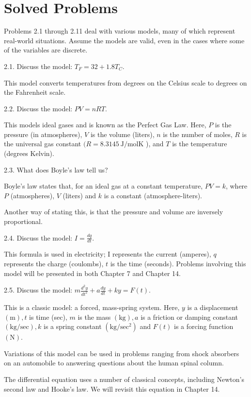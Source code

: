 \documentclass[10pt]{article}
\begin{document}
\section*{Solved Problems}
Problems 2.1 through 2.11 deal with various models, many of which represent real-world situations. Assume the models are valid, even in the cases where some of the variables are discrete.

2.1. Discuss the model: $T_{F}=32+1.8 T_{C}$.

This model converts temperatures from degrees on the Celsius scale to degrees on the Fahrenheit scale.

2.2. Discuss the model: $P V=n R T$.

This models ideal gases and is known as the Perfect Gas Law. Here, $P$ is the pressure (in atmospheres), $V$ is the volume (liters), $n$ is the number of moles, $R$ is the universal gas constant $(R=8.3145 \mathrm{~J} / \mathrm{mol} \mathrm{K}$ ), and $T$ is the temperature (degrees Kelvin).

2.3. What does Boyle's law tell us?

Boyle's law states that, for an ideal gas at a constant temperature, $P V=k$, where $P$ (atmospheres), $V$ (liters) and $k$ is a constant (atmosphere-liters).

Another way of stating this, is that the pressure and volume are inversely proportional.

2.4. Discuss the model: $I=\frac{d q}{d t}$.

This formula is used in electricity; I represents the current (amperes), $q$ represents the charge (coulombs), $t$ is the time (seconds). Problems involving this model will be presented in both Chapter 7 and Chapter 14.

2.5. Discuss the model: $m \frac{d^{2} y}{d t^{2}}+a \frac{d y}{d t}+k y=F(t)$.

This is a classic model: a forced, mass-spring system. Here, $y$ is a displacement $(\mathrm{m}), t$ is time (sec), $m$ is the mass $(\mathrm{kg}), a$ is a friction or damping constant $(\mathrm{kg} / \mathrm{sec}), k$ is a spring constant $\left(\mathrm{kg} / \mathrm{sec}^{2}\right)$ and $F(t)$ is a forcing function $(\mathrm{N})$.

Variations of this model can be used in problems ranging from shock absorbers on an automobile to answering questions about the human spinal column.

The differential equation uses a number of classical concepts, including Newton's second law and Hooke's law. We will revisit this equation in Chapter 14.
\end{document}
